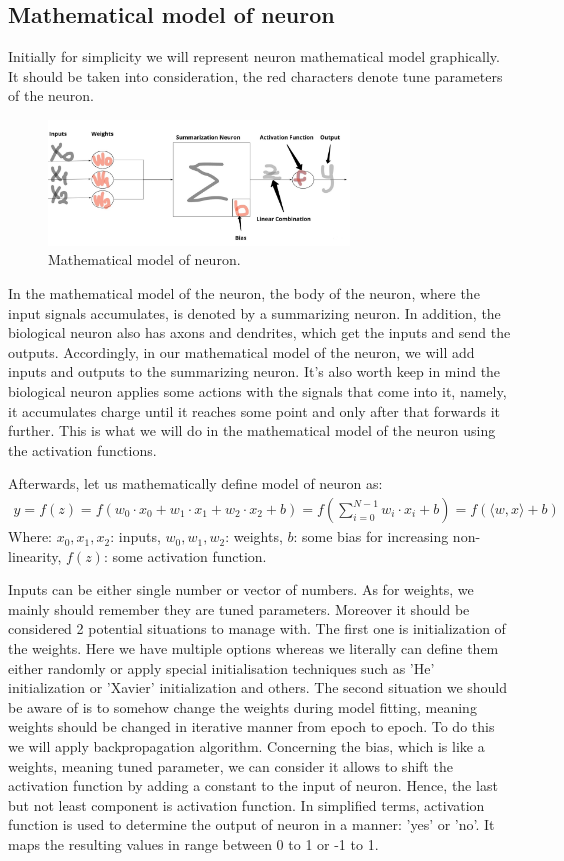 \subsection{Mathematical model of neuron}
Initially for simplicity we will represent neuron mathematical model graphically. It should be taken into consideration, the red characters denote tune parameters of the neuron.     
\begin{figure}[h]
    \centering \includegraphics[width=8cm]{images/neuron_math_model.jpg}
    \caption {Mathematical model of neuron.}
\end{figure} 

In the mathematical model of the neuron, the body of the neuron, where the input signals accumulates, is denoted by a summarizing neuron. In addition, the biological neuron also has axons and dendrites, which get the inputs and send the outputs. Accordingly, in our mathematical model of the neuron, we will add inputs and outputs to the summarizing neuron. It's also worth keep in mind the biological neuron applies some actions with the signals that come into it, namely, it accumulates charge until it reaches some point and only after that forwards it further. This is what we will do in the mathematical model of the neuron using the activation functions.

Afterwards, let us mathematically define model of neuron as:
\begin{align*}
y = f(z) = f(w_0 \cdot x_0+w_1 \cdot x_1+w_2 \cdot x_2+b) = f(\sum\limits_{i=0}^{N-1} w_i \cdot x_i+b) = f(\langle w, x \rangle + b)
\end{align*}
Where: $x_0, x_1, x_2$: inputs, $w_0, w_1, w_2$: weights,  $b$: some bias for increasing non-linearity, $f(z)$: some activation function. 

Inputs can be either single number or vector of numbers. As for weights, we mainly should remember they are tuned parameters. Moreover it should be considered 2 potential situations to manage with. The first one is initialization of the weights. Here we have multiple options whereas we literally can define them either randomly or apply special initialisation techniques such as 'He' initialization or 'Xavier' initialization and others. The second situation we should be aware of is to somehow change the weights during model fitting, meaning weights should be changed in iterative manner from epoch to epoch. To do this we will apply backpropagation algorithm. Concerning the bias, which is like a weights, meaning tuned parameter, we can consider it allows to shift the activation function by adding a constant to the input of neuron. Hence, the last but not least component is activation function. In simplified terms, activation function is used to determine the output of neuron in a manner: 'yes' or 'no'. It maps the resulting values in range between 0 to 1 or -1 to 1.            

